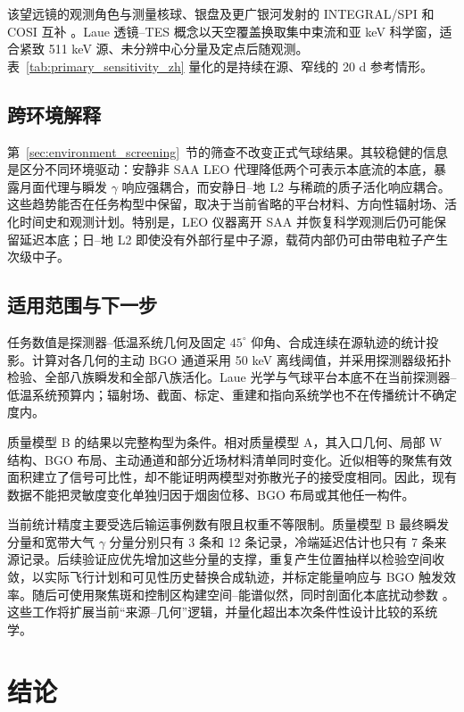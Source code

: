 \documentclass[11pt]{article}
\begin{document}
该望远镜的观测角色与测量核球、银盘及更广银河发射的 INTEGRAL/SPI 和 COSI 互补 \cite{Siegert2016AA,Kierans2020,Siegert2020COSI,Yoneda2025,Karwin2023}。Laue 透镜--TES 概念以天空覆盖换取集中束流和亚 keV 科学窗，适合紧致 511 keV 源、未分辨中心分量及定点后随观测。表~\ref{tab:primary_sensitivity_zh} 量化的是持续在源、窄线的 20 d 参考情形。

\subsection{跨环境解释}

第~\ref{sec:environment_screening}~节的筛查不改变正式气球结果。其较稳健的信息是区分不同环境驱动：安静非 SAA LEO 代理降低两个可表示本底流的本底，暴露月面代理与瞬发 $\gamma$ 响应强耦合，而安静日--地 L2 与稀疏的质子活化响应耦合。这些趋势能否在任务构型中保留，取决于当前省略的平台材料、方向性辐射场、活化时间史和观测计划。特别是，LEO 仪器离开 SAA 并恢复科学观测后仍可能保留延迟本底；日--地 L2 即使没有外部行星中子源，载荷内部仍可由带电粒子产生次级中子。

\subsection{适用范围与下一步}
\label{subsec:limitations}

任务数值是探测器--低温系统几何及固定 $45^\circ$ 仰角、合成连续在源轨迹的统计投影。计算对各几何的主动 BGO 通道采用 50 keV 离线阈值，并采用探测器级拓扑检验、全部八族瞬发和全部八族活化。Laue 光学与气球平台本底不在当前探测器--低温系统预算内；辐射场、截面、标定、重建和指向系统学也不在传播统计不确定度内。

质量模型 B 的结果以完整构型为条件。相对质量模型 A，其入口几何、局部 W 结构、BGO 布局、主动通道和部分近场材料清单同时变化。近似相等的聚焦有效面积建立了信号可比性，却不能证明两模型对弥散光子的接受度相同。因此，现有数据不能把灵敏度变化单独归因于烟囱位移、BGO 布局或其他任一构件。

当前统计精度主要受选后输运事例数有限且权重不等限制。质量模型 B 最终瞬发分量和宽带大气 $\gamma$ 分量分别只有 3 条和 12 条记录，冷端延迟估计也只有 7 条来源记录。后续验证应优先增加这些分量的支撑，重复产生位置抽样以检验空间收敛，以实际飞行计划和可见性历史替换合成轨迹，并标定能量响应与 BGO 触发效率。随后可使用聚焦斑和控制区构建空间--能谱似然，同时剖面化本底扰动参数 \cite{Cowan2011}。这些工作将扩展当前“来源--几何”逻辑，并量化超出本次条件性设计比较的系统学。

\section{结论}
\label{sec:conclusions}
\end{document}

